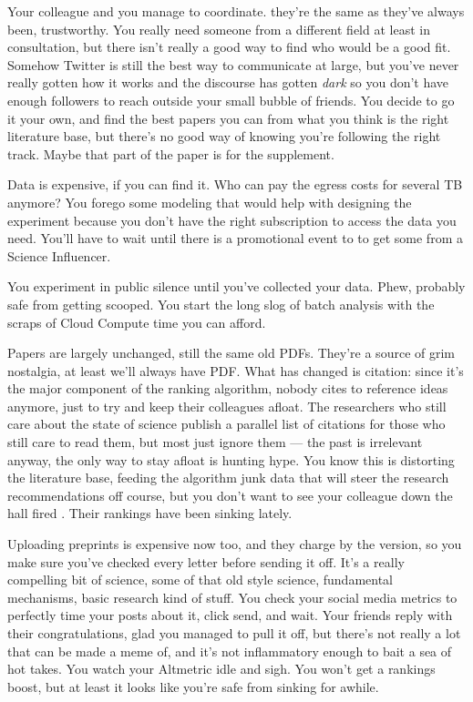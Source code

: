 Your colleague and you manage to coordinate. they're the same as they've
always been, trustworthy. You really need someone from a different field
at least in consultation, but there isn't really a good way to find who
would be a good fit. Somehow Twitter is still the best way to
communicate at large, but you've never really gotten how it works and
the discourse has gotten \emph{dark} so you don't have enough followers
to reach outside your small bubble of friends. You decide to go it your
own, and find the best papers you can from what you think is the right
literature base, but there's no good way of knowing you're following the
right track. Maybe that part of the paper is for the supplement.

Data is expensive, if you can find it. Who can pay the egress costs for
several TB anymore? You forego some modeling that would help with
designing the experiment because you don't have the right subscription
to access the data you need. You'll have to wait until there is a
promotional event to to get some from a Science Influencer.

You experiment in public silence until you've collected your data. Phew,
probably safe from getting scooped. You start the long slog of batch
analysis with the scraps of Cloud Compute time you can afford.

Papers are largely unchanged, still the same old PDFs. They're a source
of grim nostalgia, at least we'll always have PDF. What has changed is
citation: since it's the major component of the ranking algorithm,
nobody cites to reference ideas anymore, just to try and keep their
colleagues afloat. The researchers who still care about the state of
science publish a parallel list of citations for those who still care to
read them, but most just ignore them --- the past is irrelevant anyway,
the only way to stay afloat is hunting hype. You know this is distorting
the literature base, feeding the algorithm junk data that will steer the
research recommendations off course, but you don't want to see your
colleague down the hall fired \citep{brembsAlgorithmicEmploymentDecisions2021} . Their rankings have been
sinking lately.

Uploading preprints is expensive now too, and they charge by the
version, so you make sure you've checked every letter before sending it
off. It's a really compelling bit of science, some of that old style
science, fundamental mechanisms, basic research kind of stuff. You check
your social media metrics to perfectly time your posts about it, click
send, and wait. Your friends reply with their congratulations, glad you
managed to pull it off, but there's not really a lot that can be made a
meme of, and it's not inflammatory enough to bait a sea of hot takes.
You watch your Altmetric idle and sigh. You won't get a rankings boost,
but at least it looks like you're safe from sinking for awhile.

